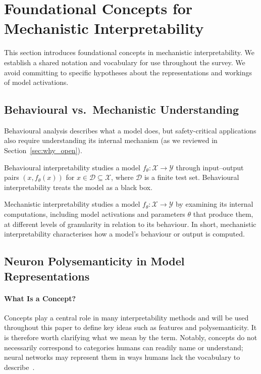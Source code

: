\section{Foundational Concepts for Mechanistic Interpretability}
\label{sec:foundations}

This section introduces foundational concepts in mechanistic interpretability. We establish a shared notation and vocabulary for use throughout the survey. We avoid committing to specific hypotheses about the representations and workings of model activations. 

\subsection{Behavioural vs.\ Mechanistic Understanding}
\label{subsec:behavioral-vs-mechanistic}

Behavioural analysis describes what a model does, but safety-critical applications also require understanding its internal mechanism (as we reviewed in Section~\ref{sec:why_open}).

\begin{definitionbox}
Behavioural interpretability studies a model $f_\theta : \mathcal{X} \to \mathcal{Y}$
through input--output pairs $(x, f_\theta(x))$ for $x \in \mathcal{D} \subseteq \mathcal{X}$,
where $\mathcal{D}$ is a finite test set. Behavioural interpretability treats the model as a black box.
\end{definitionbox}


\begin{definitionbox}
Mechanistic interpretability studies a model $f_\theta : \mathcal{X} \to \mathcal{Y}$ by examining
its internal computations, including model activations and parameters $\theta$ that produce them, at different levels of granularity in relation to its behaviour. In short, mechanistic interpretability characterises how a model's behaviour or output is computed.

\end{definitionbox}

\subsection{Neuron Polysemanticity in Model Representations}
\label{subsec:polysemanticity}

\paragraph{What Is a Concept?}
Concepts play a central role in many interpretability methods and will be used throughout this paper to define key ideas such as features and polysemanticity. It is therefore worth clarifying what we mean by the term. Notably, concepts do not necessarily correspond to categories humans can readily name or understand; neural networks may represent them in ways humans lack the vocabulary to describe~.

